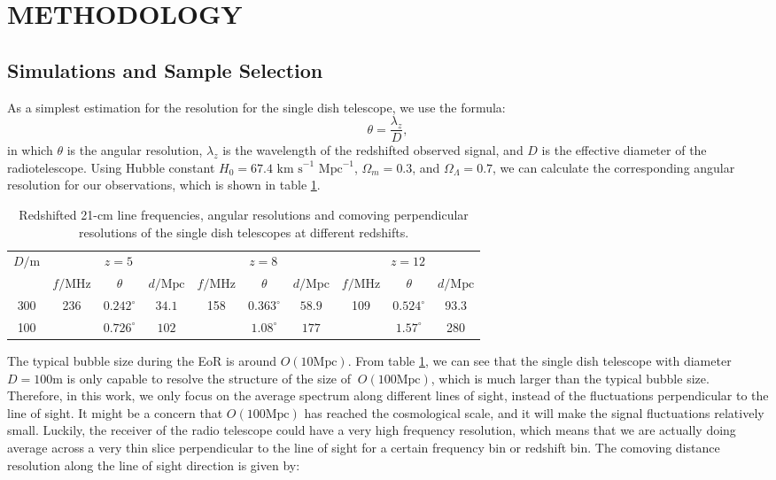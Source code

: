 \section{METHODOLOGY}
\subsection{Simulations and Sample Selection}
As a simplest estimation for the resolution for the single dish telescope, we use the formula:
\begin{equation}
    \theta = \frac{\lambda_z}{D},
\end{equation}
in which $\theta$ is the angular resolution, $\lambda_z$ is the wavelength of the redshifted observed signal, and $D$ is the effective diameter of the radiotelescope. Using Hubble constant $ H_0 = 67.4 \text{ km s}^{-1} \text{ Mpc}^{-1}$, $\Omega_m = 0.3$, and $\Omega_\Lambda = 0.7$, we can calculate the corresponding angular resolution for our observations, which is shown in table \ref{tab:angular_resolution}.

\begin{table}[h]
    \caption{Redshifted 21-cm line frequencies, angular resolutions and comoving perpendicular resolutions of the single dish telescopes at different redshifts.}
    \label{tab:angular_resolution}
    \centering
    \begin{tabular}{cccccccccc}
        \toprule
        \multirow{2}{*}{$D/\text{m}$}&\multicolumn{3}{c}{$z=5$}&\multicolumn{3}{c}{$z=8$}&\multicolumn{3}{c}{$z=12$}\\
        \cmidrule(lr){2-10}
        &$f/\text{MHz}$&$\theta$&$d/\text{Mpc}$&$f/\text{MHz}$&$\theta$&$d/\text{Mpc}$&$f/\text{MHz}$&$\theta$&$d/\text{Mpc}$\\
        \midrule
        300         &\multirow{2}{*}{236}&$0.242^\circ$&$34.1$&\multirow{2}{*}{158}&$0.363^\circ$& $58.9$&\multirow{2}{*}{109}&$0.524^\circ$&93.3\\
        100         &&$0.726^\circ$&$102$ &&$1.08^\circ$& $177$&&$1.57^\circ$&280\\
        \bottomrule
    \end{tabular}
\end{table}

The typical bubble size during the EoR is around $O(10 \text{Mpc})$. From table \ref{tab:angular_resolution}, we can see that the single dish telescope with diameter $D=100 \text{m}$ is only capable to resolve the structure of the size of $~O(100 \text{Mpc})$, which is much larger than the typical bubble size. Therefore, in this work, we only focus on the average spectrum along different lines of sight, instead of the fluctuations perpendicular to the line of sight. It might be a concern that $O(100 \text{Mpc})$ has reached the cosmological scale, and it will make the signal fluctuations relatively small. Luckily, the receiver of the radio telescope could have a very high frequency resolution, which means that we are actually doing average across a very thin slice perpendicular to the line of sight for a certain frequency bin or redshift bin. The comoving distance resolution along the line of sight direction is given by: